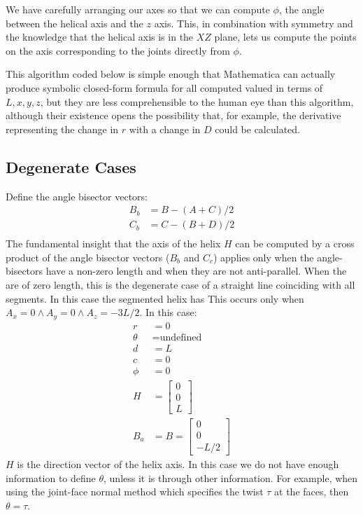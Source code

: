 \documentclass[11pt]{article}
\begin{document}
{We have carefully arranging our axes
so that we can compute $\phi$, the angle between the helical axis
and the $z$ axis. This, in combination with symmetry and the knowledge
that the helical axis is in the $XZ$ plane, lets us compute the
points on the axis corresponding to the joints directly from $\phi$.

This algorithm coded below is simple enough that Mathematica\cite{Mathematica} can
actually produce symbolic closed-form formula for all computed valued
in terms of $L, x, y, z$, but they are less comprehensible to the
human eye than this algorithm, although their existence opens
the possibility that, for example, the derivative representing
the change in $r$ with a change in $D$ could be calculated.

\subsection{Degenerate Cases}

Define the angle bisector vectors:
\begin{align}
  B_b &= B - (A + C)/2 \\
  C_b &= C - (B + D)/2 \\
  \end{align}
The fundamental insight that the axis of the helix $H$ can be
computed by a cross product of the angle bisector
vectors ($B_b$ and $C_c$) applies only
when the angle-bisectors have a non-zero length and when
they are not anti-parallel. When the are of zero length, this is
the degenerate case of a straight line coinciding with all segments.
In this case the segmented helix has
This occurs only when $A_x = 0 \wedge A_y = 0 \wedge A_z = -3L/2$.
In this case:
\begin{align}
  r &= 0 \\
  \theta &= \text{undefined}\\
  d &= L \\
  c &= 0 \\
  \phi &= 0 \\
  H &=  \begin{bmatrix} 0 \\ 0 \\ L  \end{bmatrix} \\
  B_a &= B = \begin{bmatrix} 0 \\ 0 \\ -L/2  \end{bmatrix}
\end{align}
$H$ is the direction vector of the helix axis.
In this case we do not have enough information to define $\theta$,
unless it is through other information. For example, when using
the joint-face normal method which specifies
the twist $\tau$ at the faces, then $\theta = \tau$.

}
\end{document}
